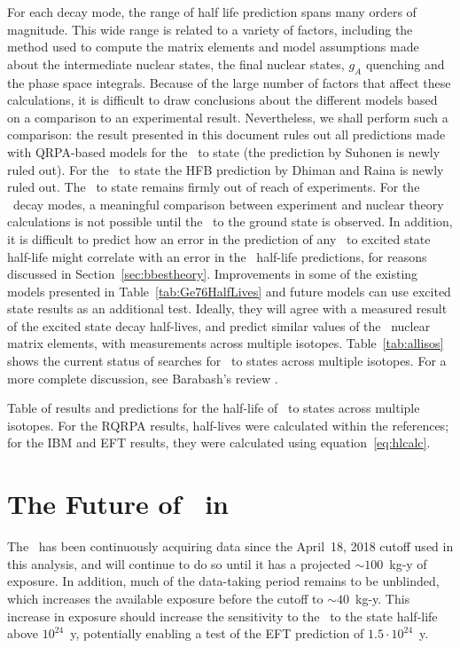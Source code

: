 \documentclass[/main.tex]{subfiles}
\begin{document}
For each decay mode, the range of half life prediction spans many orders of magnitude.
This wide range is related to a variety of factors, including the method used to compute the matrix elements and model assumptions made about the intermediate nuclear states, the final nuclear states, $g_A$ quenching and the phase space integrals.
Because of the large number of factors that affect these calculations, it is difficult to draw conclusions about the different models based on a comparison to an experimental result.
Nevertheless, we shall perform such a comparison: the result presented in this document rules out all predictions made with QRPA-based models for the \tnbb\ to  state (the prediction by Suhonen\cite{gerdaESresult} is newly ruled out).
For the \tnbb\ to  state the HFB prediction by Dhiman and Raina\cite{dhiman1994} is newly ruled out.
The \tnbb\ to  state remains firmly out of reach of experiments.
For the \znbb\ decay modes, a meaningful comparison between experiment and nuclear theory calculations is not possible until the \znbb\ to the ground state is observed.
In addition, it is difficult to predict how an error in the prediction of any \tnbb\ to excited state half-life might correlate with an error in the \znbb\ half-life predictions, for reasons discussed in Section~\ref{sec:bbestheory}.
Improvements in some of the existing models presented in Table~\ref{tab:Ge76HalfLives} and future models can use excited state results as an additional test.
Ideally, they will agree with a measured result of the excited state decay half-lives, and predict similar values of the \znbb\ nuclear matrix elements, with measurements across multiple isotopes.
Table~\ref{tab:allisos} shows the current status of searches for \tnbb\ to  states across multiple isotopes.
For a more complete discussion, see Barabash's review \cite{barabash2017}. 
\begin{table}
  \centering
  \caption[Table of \tnbb\ to  states across multiple isotopes]{\label{tab:allisos}
    Table of results and predictions for the half-life of \tnbb\ to  states across multiple isotopes. For the RQRPA results, half-lives were calculated within the references; for the IBM and EFT results, they were calculated using equation~\ref{eq:hlcalc}.
  }
  
\end{table}

\section{The Future of \bbes\ in }
The \MJD\ has been continuously acquiring data since the April~18, 2018 cutoff used in this analysis, and will continue to do so until it has a projected $\sim100$~kg-y of exposure.
In addition, much of the data-taking period remains to be unblinded, which increases the available exposure before the cutoff to $\sim40$~kg-y.
This increase in exposure should increase the sensitivity to the \bbes\ to the  state half-life above $10^{24}$~y, potentially enabling a test of the EFT prediction of $1.5\cdot10^{24}$~y\cite{menendez2018}.
\end{document}
